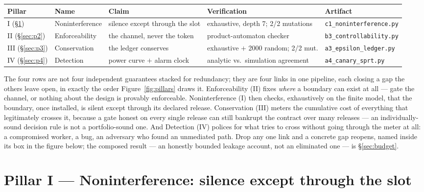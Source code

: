 \documentclass[11pt,a4paper]{article}
\begin{document}
\begin{center}
\begin{tabular}{@{}lllll@{}}
\toprule
Pillar & Name & Claim & Verification & Artifact \\
\midrule
I (\S\ref{sec:p1}) & Noninterference & silence except through the slot & exhaustive, depth 7; 2/2 mutations &
\texttt{c1\_noninterference.py} \\
II (\S\ref{sec:p2}) & Enforceability & the channel, never the token & product-automaton checker &
\texttt{b3\_controllability.py} \\
III (\S\ref{sec:p3}) & Conservation & the ledger conserves & exhaustive $+$ 2000 random; 2/2 mut. &
\texttt{a3\_epsilon\_ledger.py} \\
IV (\S\ref{sec:p4}) & Detection & power curve $+$ alarm clock & analytic vs.\ simulation agreement &
\texttt{a4\_canary\_sprt.py} \\
\bottomrule
\end{tabular}
\end{center}

The four rows are not four independent guarantees stacked for redundancy; they are four links in one pipeline, each closing a gap
the others leave open, in exactly the order Figure~\ref{fig:pillars} draws it. Enforceability (II) fixes \emph{where} a boundary
can exist at all --- gate the channel, or nothing about the design is provably enforceable. Noninterference (I) then checks, exhaustively on the finite model, that the
boundary, once installed, is silent except through its declared release. Conservation (III) meters the cumulative cost of
everything that legitimately crosses it, because a gate honest on every single release can still bankrupt the contract over many
releases --- an individually-sound decision rule is not a portfolio-sound one. And Detection (IV) polices for what tries to cross
without going through the meter at all: a compromised worker, a bug, an adversary who found an unmediated path. Drop any one link
and a concrete gap reopens, named inside its box in the figure below; the composed result --- an honestly bounded leakage account,
not an eliminated one --- is \S\ref{sec:budget}.



\section{Pillar I --- Noninterference: silence except through the slot}\label{sec:p1}
\end{document}
